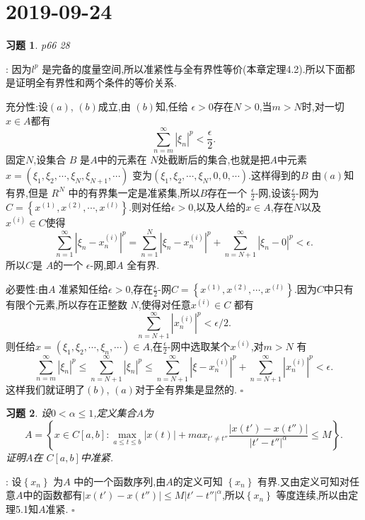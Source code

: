 \documentclass[a4paper]{article}
\newtheorem*{exe}{习题}
\newenvironment{sol}{{\noindent\bfseries 解}:}{\hfill $\square$\par}
\begin{document}
\section{2019-09-24}
\begin{exe}
  p66 28	
\end{exe}
\begin{sol}
  因为$l^{p}$ 是完备的度量空间,所以准紧性与全有界性等价(本章定理4.2).所以下面都是证明全有界性和两个条件的等价关系.

  充分性:设$(a)$, $(b)$成立,由 $(b)$知,任给 $\epsilon >0$存在$N>0$,当$m>N$时,对一切 $x\in A$都有
  \[
    \sum_{n=m}^{\infty} \left| \xi_n \right|^{p} <\frac{\epsilon}{2} 
  .\]
  固定$N$,设集合 $B$ 是$A$中的元素在 $N$处截断后的集合,也就是把$A$中元素 $x=\left( \xi_1,\xi_2,\cdots,\xi_N,\xi_{N+1},\cdots \right) $ 变为$\left( \xi_1,\xi_2,\cdots,\xi_N,0,0,\cdots \right) $.这样得到的$B$ 由$(a)$知有界,但是 $R^{N}$ 中的有界集一定是准紧集,所以$B$存在一个 $\frac{\epsilon }{2}$-网,设该$\frac{\epsilon }{2}$-网为$C=\left\{ x^{(1)},x^{(2)},\cdots,x^{(l)} \right\} $.则对任给$\epsilon >0$,以及人给的$x\in A$,存在$N$以及 $x^{(i)}\in C$使得
  \[
  \sum_{n=1}^{\infty} \left| \xi_n-x^{(i)}_n \right| ^{p}=\sum_{n=1}^{N} \left| \xi_n-x^{(i)}_n \right| ^{p}+\sum_{n=N+1}^{\infty} \left| \xi_n -0\right|^{p}<\epsilon  
  .\]
  所以$C$是 $A$的一个 $\epsilon $-网,即$A$ 全有界.

  必要性:由$A$ 准紧知任给$\epsilon >0$,存在$\frac{\epsilon }{2} $-网$C=\left\{ x^{(1)},x^{(2)},\cdots,x^{(l)} \right\} $.因为$C$中只有有限个元素,所以存在正整数 $N$,使得对任意$x^{(i)}\in C$ 都有
  \[
  \sum_{n=N+1}^{\infty} \left| x_{n}^{(i)} \right| ^{p}<\epsilon /2
  .\] 
  则任给$x=\left( \xi_1,\xi_2,\cdots,\xi_n,\cdots \right)\in A $,在$\frac{\epsilon }{2}$-网中选取某个$x^{(i)}$,对$m>N$ 有
  \[
  \sum_{n=m}^{\infty} \left| \xi_n \right| ^{p}\le \sum_{n=N+1}^{\infty} \left| \xi_n \right| ^{p}\le \sum_{n=N+1}^{\infty} \left| \xi-x^{(i)}_n \right|^{p} +\sum_{n=N+1}^{\infty} \left| x^{(i)}_n \right|^{p} <\epsilon 
  .\]
  这样我们就证明了$(b)$, $(a)$对于全有界集是显然的.
\end{sol}
\begin{exe}
  设$0<\alpha\le 1$,定义集合$A$为
  \[
    A=\left\{ x\in C[a,b]:\max_{a\le t\le b}\left| x(t) \right| +max_{t'\neq t''}\frac{\left| x(t')-x(t'') \right| }{\left| t'-t'' \right| ^{\alpha}}\le M \right\} 
  .\]
  证明$A$在 $C[a,b]$中准紧.
\end{exe}
\begin{sol}
  设$\left\{ x_n \right\} $ 为$A$ 中的一个函数序列,由$A$的定义可知 $\left\{ x_n \right\} $ 有界.又由定义可知对任意$A$中的函数都有$\left| x(t')-x(t'') \right| \le M\left| t'-t'' \right| ^{\alpha}$,所以$\left\{ x_n \right\} $ 等度连续,所以由定理5.1知$A$准紧.
\end{sol}
\end{document}
